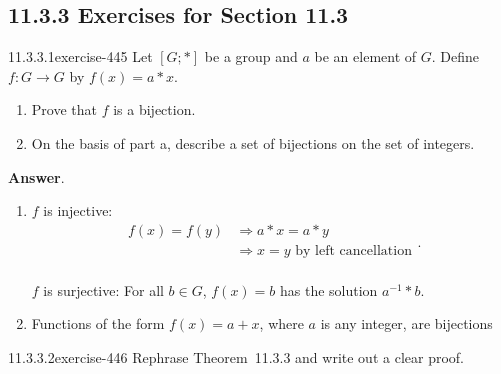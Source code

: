 \documentclass[twoside,10pt,]{book}
\numberwithin{equation}{section}
\begin{document}
\subsection*{11.3.3 Exercises for Section 11.3}
\begin{divisionsolution}{11.3.3.1}{}{exercise-445}%
\hypertarget{p-3928}{}%
Let \([G; * ]\) be a group and \(a\) be an element of \(G\).  Define \(f:G \to  G\) by \(f(x) = a * x\).\leavevmode%
\begin{enumerate}[label=(\alph*)]
\item\hypertarget{li-1788}{}\hypertarget{p-3929}{}%
Prove that \(f\) is a bijection.%
\item\hypertarget{li-1789}{}\hypertarget{p-3930}{}%
On the basis of part a, describe a set of bijections on the set of integers.%
\end{enumerate}
%
\par\smallskip%
\noindent\textbf{Answer}.\quad%
\hypertarget{p-3931}{}%
\leavevmode%
\begin{enumerate}[label=(\alph*)]
\item\hypertarget{li-1790}{}\hypertarget{p-3932}{}%
\(f\) is injective:%
\begin{equation*}
\begin{split}
f(x) = f(y) & \Rightarrow  a * x = a * y \\
& \Rightarrow  x = y\textrm{       by left cancellation}\\
\end{split}\text{.}
\end{equation*}
%
\par
\hypertarget{p-3933}{}%
\(f\) is surjective:  For all \(b \in G\),   \(f(x) = b\) has the solution \(a^{-1}*b\).%
\item\hypertarget{li-1791}{}\hypertarget{p-3934}{}%
Functions of the form \(f(x) = a + x\), where \(a\) is any integer, are bijections%
\end{enumerate}
%
\end{divisionsolution}%
\begin{divisionsolution}{11.3.3.2}{}{exercise-446}%
\hypertarget{p-3935}{}%
Rephrase Theorem~11.3.3 and write out a clear proof.%
\end{divisionsolution}%
\end{document}
